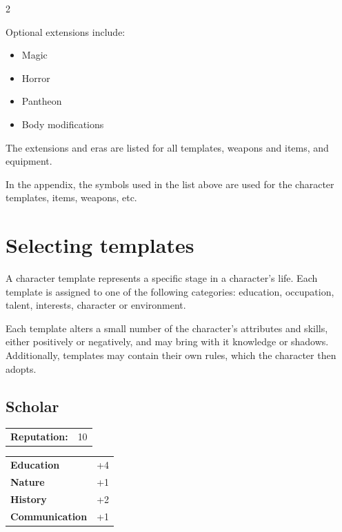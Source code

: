 \begin{multicols}{2}
{Optional extensions include:

\begin{itemize}
    \item Magic 
    \item Horror 
    \item Pantheon 
    \item Body modifications 
\end{itemize}

The extensions and eras are listed for all templates, weapons and items, and equipment. 

In the appendix, the symbols used in the list above are used for the character templates, items, weapons, etc.
}{}

\section{Selecting templates}

A character template represents a specific stage in a character's life. Each template is assigned to one of the following categories: education, occupation, talent, interests, character or environment.

Each template alters a small number of the character's attributes and skills, either positively or negatively, and may bring with it knowledge or shadows. Additionally, templates may contain their own rules, which the character then adopts.

\begin{tcolorbox}
\subsection*{Scholar}
\tcblower
\begin{tabular}{@{}ll@{}}
    \textbf{Reputation:} & 10\\
\end{tabular}

\begin{tabular}{@{}ll@{}}
    \textbf{Education} & +4\\
    \textbf{Nature} & +1\\
    \textbf{History} & +2\\
    \textbf{Communication} & +1\\
\end{tabular}
\end{tcolorbox}


\end{multicols}
